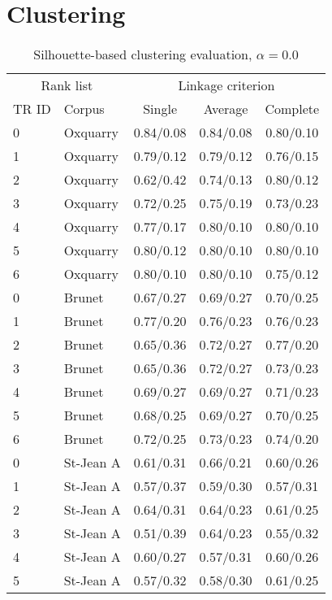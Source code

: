 \section{Clustering}

\begin{table}[H]
  \centering
  \caption{Silhouette-based clustering evaluation, $\alpha = 0.0$}
  \label{tab:silhouette-based_clustering_full}

  \begin{tabular}{l l c c c}
    \toprule
    \multicolumn{2}{c}{Rank list} & \multicolumn{3}{c}{Linkage criterion} \\
    TR ID & Corpus & Single & Average & Complete \\
    \midrule
    0 & Oxquarry & 0.84/0.08 & 0.84/0.08 & 0.80/0.10 \\
    1 & Oxquarry & 0.79/0.12 & 0.79/0.12 & 0.76/0.15 \\
    2 & Oxquarry & 0.62/0.42 & 0.74/0.13 & 0.80/0.12 \\
    3 & Oxquarry & 0.72/0.25 & 0.75/0.19 & 0.73/0.23 \\
    4 & Oxquarry & 0.77/0.17 & 0.80/0.10 & 0.80/0.10 \\
    5 & Oxquarry & 0.80/0.12 & 0.80/0.10 & 0.80/0.10 \\
    6 & Oxquarry & 0.80/0.10 & 0.80/0.10 & 0.75/0.12 \\
    0 & Brunet & 0.67/0.27 & 0.69/0.27 & 0.70/0.25 \\
    1 & Brunet & 0.77/0.20 & 0.76/0.23 & 0.76/0.23 \\
    2 & Brunet & 0.65/0.36 & 0.72/0.27 & 0.77/0.20 \\
    3 & Brunet & 0.65/0.36 & 0.72/0.27 & 0.73/0.23 \\
    4 & Brunet & 0.69/0.27 & 0.69/0.27 & 0.71/0.23 \\
    5 & Brunet & 0.68/0.25 & 0.69/0.27 & 0.70/0.25 \\
    6 & Brunet & 0.72/0.25 & 0.73/0.23 & 0.74/0.20 \\
    0 & St-Jean A & 0.61/0.31 & 0.66/0.21 & 0.60/0.26 \\
    1 & St-Jean A & 0.57/0.37 & 0.59/0.30 & 0.57/0.31 \\
    2 & St-Jean A & 0.64/0.31 & 0.64/0.23 & 0.61/0.25 \\
    3 & St-Jean A & 0.51/0.39 & 0.64/0.23 & 0.55/0.32 \\
    4 & St-Jean A & 0.60/0.27 & 0.57/0.31 & 0.60/0.26 \\
    5 & St-Jean A & 0.57/0.32 & 0.58/0.30 & 0.61/0.25 \\

\end{tabular}
\end{table}
